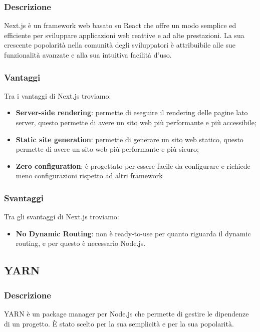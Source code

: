 \subsubsection*{Descrizione}
Next.js è un framework web basato su React che offre un modo semplice ed efficiente per sviluppare applicazioni web reattive e ad alte prestazioni. La sua crescente popolarità nella comunità degli sviluppatori è attribuibile alle sue funzionalità avanzate e alla sua intuitiva facilità d'uso.

\subsubsection*{Vantaggi}
Tra i vantaggi di Next.js troviamo:
\begin{itemize}
    \item \textbf{Server-side rendering}: permette di eseguire il rendering delle pagine lato server, questo permette di avere un sito web più performante e più accessibile;
    \item \textbf{Static site generation}: permette di generare un sito web statico, questo permette di avere un sito web più performante e più sicuro;
    \item \textbf{Zero configuration}: è progettato per essere facile da configurare e richiede meno configurazioni rispetto ad altri framework
\end{itemize}

\subsubsection*{Svantaggi}
Tra gli svantaggi di Next.js troviamo:
\begin{itemize}
    \item \textbf{No Dynamic Routing}: non è ready-to-use per quanto riguarda il dynamic routing, e per questo è necessario Node.js.
\end{itemize}


\subsection*{YARN}

\subsubsection*{Descrizione}
YARN è un package manager per Node.js che permette di gestire le dipendenze di un progetto. È stato scelto per la sua semplicità e per la sua popolarità.

